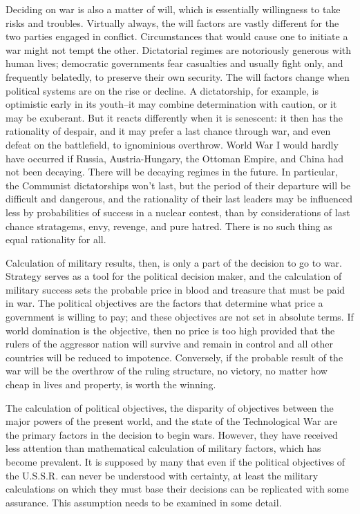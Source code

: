 Deciding on war is also a matter of will, which is essentially willingness to take risks and troubles. Virtually always, the will factors are vastly different for the two parties engaged in conflict. Circumstances that would cause one to initiate a war might not tempt the other. Dictatorial regimes are notoriously generous with human lives; democratic governments fear casualties and usually fight only, and frequently belatedly, to preserve their own security. The will factors change when political systems are on the rise or decline. A dictatorship, for example, is optimistic early in its youth--it may combine determination with caution, or it may be exuberant. But it reacts differently when it is senescent: it then has the rationality of despair, and it may prefer a last chance through war, and even defeat on the battlefield, to ignominious overthrow. World War I would hardly have occurred if Russia, Austria-Hungary, the Ottoman Empire, and China had not been decaying. There will be decaying regimes in the future. In particular, the Communist dictatorships won't last, but the period of their departure will be difficult and dangerous, and the rationality of their last leaders may be influenced less by probabilities of success in a nuclear contest, than by considerations of last chance stratagems, envy, revenge, and pure hatred. There is no such thing as equal rationality for all.

Calculation of military results, then, is only a part of the decision to go to war. Strategy serves as a tool for the political decision maker, and the calculation of military success sets the probable price in blood and treasure that must be paid in war. The political objectives are the factors that determine what price a government is willing to pay; and these objectives are not set in absolute terms. If world domination is the objective, then no price is too high provided that the rulers of the aggressor nation will survive and remain in control and all other countries will be reduced to impotence. Conversely, if the probable result of the war will be the overthrow of the ruling structure, no victory, no matter how cheap in lives and property, is worth the winning.

The calculation of political objectives, the disparity of objectives between the major powers of the present world, and the state of the Technological War are the primary factors in the decision to begin wars. However, they have received less attention than mathematical calculation of military factors, which has become prevalent. It is supposed by many that even if the political objectives of the U.S.S.R. can never be understood with certainty, at least the military calculations on which they must base their decisions can be replicated with some assurance. This assumption needs to be examined in some detail.


